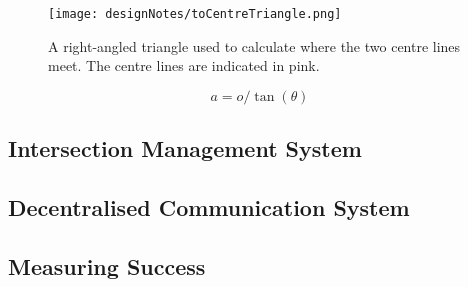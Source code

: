 \begin{figure}[htb]
\texttt{[image: designNotes/toCentreTriangle.png]}
\caption{A right-angled triangle used to calculate where the two centre lines meet. The centre lines are indicated in pink.}
\label{fig:toCentreTriangle}
\end{figure}

\begin{equation}\label{aTan}
a = o / \tan(\theta)
\end{equation}

\subsection{Intersection Management System}
\label{subsec:Intersection Management System}

\subsection{Decentralised Communication System}
\label{subsec:Decentralised Communication System}

\subsection{Measuring Success}
\label{subsec:Measuring Success}
